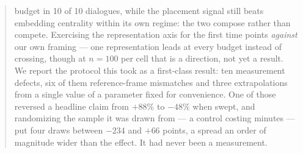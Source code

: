\documentclass[sigconf, nonacm]{acmart}
\begin{document}
\begin{abstract}
budget in 10 of 10 dialogues, while the placement signal still beats embedding centrality within its own
regime: the two compose rather than compete. Exercising the representation axis for the first time
points \emph{against} our own framing --- one representation leads at every budget instead of crossing,
though at $n{=}100$ per cell that is a direction, not yet a result. We report the protocol this took as a first-class result: ten measurement
defects, six of them reference-frame mismatches and three extrapolations from a single value of a
parameter fixed for convenience. One of those reversed a headline claim from $+88\%$ to $-48\%$ when
swept, and randomizing the sample it was drawn from --- a control costing minutes --- put four draws
between $-234$ and $+66$ points, a spread an order of magnitude wider than the effect. It had never been
a measurement.
\end{abstract}


\maketitle

\vldbtopmatter












\end{document}
